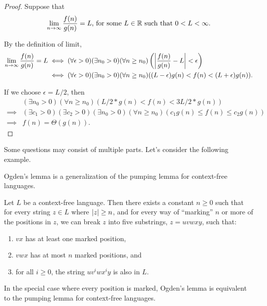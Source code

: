 \documentclass{homework}
\begin{document}
\begin{proof}
    Suppose that
    \begin{align*}
        \lim_{n \to \infty} \frac{f(n)}{g(n)} = L \text{, for some } L \in \mathbb{R} \text{ such that } 0 < L < \infty.
    \end{align*}

    By the definition of limit,
    \begin{align*}
        \lim_{n \to \infty} \frac{f(n)}{g(n)} = L & \iff (\forall \epsilon > 0) (\exists n_0 > 0) (\forall n \geq n_0) \left( \abs{\frac{f(n)}{g(n)} - L} < \epsilon \right) \\
                                                  & \iff (\forall \epsilon > 0) (\exists n_0 > 0) (\forall n \geq n_0) ((L - \epsilon) g(n) < f(n) < (L + \epsilon) g(n)).
    \end{align*}

    If we choose $\epsilon = L/2$, then
    \begin{align*}
                 & (\exists n_0 > 0) (\forall n \geq n_0) (L/2 * g(n) < f(n) < 3 L/2 * g(n))                                     \\
        \implies & (\exists c_1 > 0) (\exists c_2 > 0) (\exists n_0 > 0) (\forall n \geq n_0) (c_1 g(n) \leq f(n) \leq c_2 g(n)) \\
        \implies & f(n) = \Theta(g(n)).
    \end{align*}
\end{proof}

\newpage

\question
Some questions may consist of multiple parts. Let's consider the following example.

Ogden's lemma is a generalization of the pumping lemma for context-free languages.

\begin{theorem}
    Let $L$ be a context-free language. Then there exists a constant $n \geq 0$ such that for every string $z \in L$ where $\abs{z} \geq n$, and for every way of ``marking'' $n$ or more of the positions in $z$, we can break $z$ into five substrings, $z = uvwxy$, such that:
    \begin{enumerate}
        \item $vx$ has at least one marked position,
        \item $vwx$ has at most $n$ marked positions, and
        \item for all $i \geq 0$, the string $u v^i w x^i y$ is also in $L$.
    \end{enumerate}
    In the special case where every position is marked, Ogden's lemma is equivalent to the pumping lemma for context-free languages.
\end{theorem}
\end{document}
